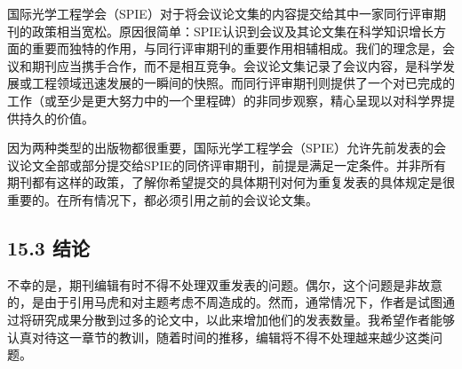 国际光学工程学会（SPIE）对于将会议论文集的内容提交给其中一家同行评审期刊的政策相当宽松。原因很简单：SPIE认识到会议及其论文集在科学知识增长方面的重要而独特的作用，与同行评审期刊的重要作用相辅相成。我们的理念是，会议和期刊应当携手合作，而不是相互竞争。会议论文集记录了会议内容，是科学发展或工程领域迅速发展的一瞬间的快照。而同行评审期刊则提供了一个对已完成的工作（或至少是更大努力中的一个里程碑）的非同步观察，精心呈现以对科学界提供持久的价值。

因为两种类型的出版物都很重要，国际光学工程学会（SPIE）允许先前发表的会议论文全部或部分提交给SPIE的同侪评审期刊，前提是满足一定条件。并非所有期刊都有这样的政策，了解你希望提交的具体期刊对何为重复发表的具体规定是很重要的。在所有情况下，都必须引用之前的会议论文集。

\subsection*{15.3 结论}
不幸的是，期刊编辑有时不得不处理双重发表的问题。偶尔，这个问题是非故意的，是由于引用马虎和对主题考虑不周造成的。然而，通常情况下，作者是试图通过将研究成果分散到过多的论文中，以此来增加他们的发表数量。我希望作者能够认真对待这一章节的教训，随着时间的推移，编辑将不得不处理越来越少这类问题。

